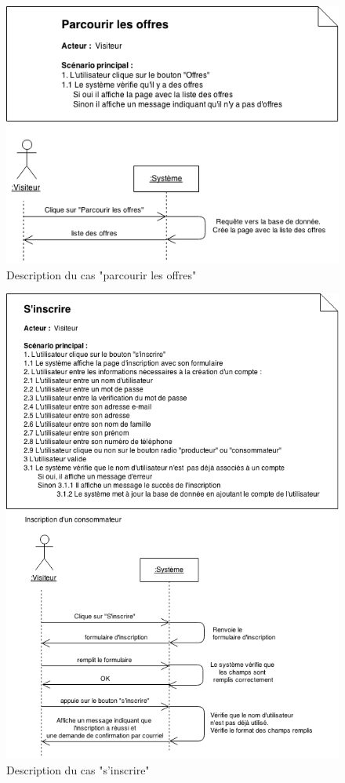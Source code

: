 \documentclass[12pt]{report}
\begin{document}
\begin{figure}[!h]
\centering
\includegraphics[width=1.\textwidth]{./ressources/desc_UC_parcourir_offres.png}
\caption{Description du cas "parcourir les offres"}
\end{figure}
\clearpage

\begin{figure}[!h]
\centering
\includegraphics[width=1.\textwidth]{./ressources/desc_UC_inscrire.png}
\caption{Description du cas "s'inscrire"}
\end{figure}
\end{document}
